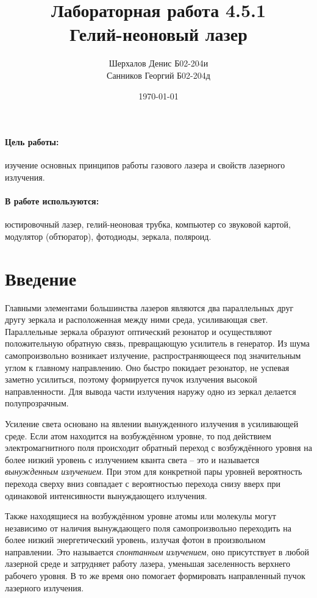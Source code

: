 \documentclass[a4paper,12pt]{article}
\author{Шерхалов Денис Б02-204и \\
		Санников Георгий Б02-204д}
\title{Лабораторная работа 4.5.1 \\
	\textbf{Гелий-неоновый лазер}}
\date{\today}
\theoremstyle{definition}
\begin{document}
	
{\Large \maketitle}

	\paragraph*{Цель работы:} изучение основных принципов работы газового лазера и свойств лазерного излучения.
	\paragraph*{В работе используются:} юстировочный лазер, гелий-неоновая трубка, компьютер со звуковой картой, модулятор (обтюратор), фотодиоды, зеркала, поляроид.

\section{Введение}

\par Главными элементами большинства лазеров являются два параллельных друг другу зеркала и 
расположенная между ними среда, усиливающая свет. Параллельные зеркала образуют оптический 
резонатор и осуществляют положительную обратную связь, превращающую усилитель в генератор. 
Из шума самопроизвольно возникает излучение, распространяющееся под значительным углом к главному 
направлению. Оно быстро покидает резонатор, не успевая заметно усилиться, поэтому формируется пучок 
излучения высокой направленности. Для вывода части излучения наружу одно из зеркал делается 
полупрозрачным.

\par Усиление света основано на явлении вынужденного излучения в усиливающей среде. Если атом 
находится на возбуждённом уровне, то под действием  электромагнитного поля происходит обратный 
переход с возбуждённого уровня на более низкий уровень с излучением кванта света -- это и 
называется \textit{вынужденным излучением}. При этом для конкретной пары уровней вероятность 
перехода сверху вниз совпадает с вероятностью перехода снизу вверх при одинаковой интенсивности 
вынуждающего излучения.

\par Также находящиеся на возбуждённом уровне атомы или молекулы могут независимо от наличия 
вынуждающего поля самопроизвольно переходить на более низкий энергетический уровень, излучая
фотон в произвольном направлении. Это называется \textit{спонтанным излучением}, оно присутствует 
в любой лазерной среде и затрудняет работу лазера, уменьшая заселенность верхнего рабочего уровня. 
В то же время оно помогает формировать направленный пучок лазерного излучения.
\end{document}
